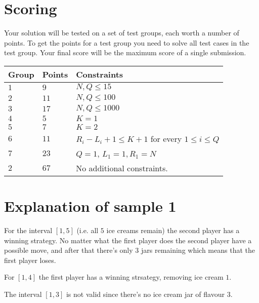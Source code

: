 \section*{Scoring}
Your solution will be tested on a set of test groups, each worth a number of points.
To get the points for a test group you need to solve all test cases in the test group. Your final score will be the maximum score of a single submission.

\noindent
\begin{tabular}{| l | l | l |}
  \hline
  Group & Points & Constraints \\ \hline
  $1$     & $9$          &  $N,Q \le 15$ \\ \hline
  $2$     & $11$         &  $N,Q \le 100$  \\ \hline
  $3$     & $17$         &  $N,Q \le 1000$  \\ \hline
  $4$     & $5$          &  $K=1$  \\ \hline
  $5$     & $7$          &  $K=2$  \\ \hline
  $6$     & $11$        &  $R_i - L_i + 1 \le K+1$ for every $1 \le i \le Q$  \\ \hline
  $7$     & $23$         &  $Q=1$, $L_1=1, R_1=N$ \\ \hline
  $2$    & $67$        &  No additional constraints. \\ \hline
\end{tabular}

\section*{Explanation of sample 1}
For the interval $[1, 5]$ (i.e. all $5$ ice creams remain) the second player has a winning strategy.
No matter what the first player does the second player have a possible move, and after that there's only $3$ jars remaining which means that the first player loses.

For $[1, 4]$ the first player has a winning strsategy, removing ice cream $1$.

The interval $[1, 3]$ is not valid since there's no ice cream jar of flavour $3$.

